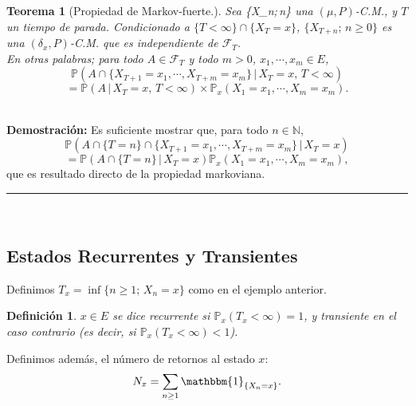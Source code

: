\documentclass[a4paper]{article}
\newcommand{\prob}{\mathbb{P}}
\newtheorem{definicion}{Definición}
\newtheorem{teorema}{Teorema}
\numberwithin{equation}{subsection}
\numberwithin{definicion}{subsection}
\def\N{\mathbb N}
\begin{document}
\begin{teorema}[Propiedad de Markov-fuerte.]
Sea \{X_n;\,n\} una $(\mu,P)$-C.M., y $T$ un tiempo de parada. Condicionado a $\{T<\infty\}\cap\{X_T = x\}$, $\{X_{T+n};\,n\geq 0\}$ es una $(\delta_x,P)$-C.M. que es independiente de $\mathcal{F}_T$.\\ \newline
En otras palabras; para todo $A\in \mathcal{F}_T$ y todo $m>0$, $x_1,\cdots,x_m \in E$,
\[\prob\left(A\cap\{X_{T+1}=x_1,\cdots,X_{T+m}=x_m\}\,|\,X_T=x,\,T<\infty\right)\]
\[= \prob\left(A\,|\,X_T = x,\,T<\infty\right)\times\prob_x\left(X_1 = x_1,\cdots,X_m = x_m\right).\]
\end{teorema}\\ \newline
\textbf{Demostración: }Es suficiente mostrar que, para todo $n\in \N$,
\[\prob\left(A\cap\{T=n\}\cap\{X_{T+1}=x_1,\cdots,X_{T+m}=x_m\}\,|\,X_T=x\right)\]
\[= \prob\left(A\cap\{T=n\}\,|\,X_T = x\right)\prob_x\left(X_1 = x_1,\cdots,X_m=x_m\right),\]
que es resultado directo de la propiedad markoviana.\\ \newline
\rule{0.7em}{0.7em}\\ \newline

\subsection{Estados Recurrentes y Transientes }
Definimos $T_x = \inf\{n\geq 1;\,X_n = x\}$ como en  el ejemplo anterior.\\ \newline

\begin{definicion}
$x\in E$ se dice \textit{recurrente} si $\prob_x\left(T_x <\infty\right)=1$, y \textit{transiente} en el caso contrario (es decir, si $\prob_x\left(T_x<\infty\right)<1$).
\end{definicion}
 Definimos además, el número de retornos al estado $x$:
 \[N_x = \sum_{n\geq 1}\mathbbm{1}_{\{X_n = x\}}.\]
 
\end{document}
